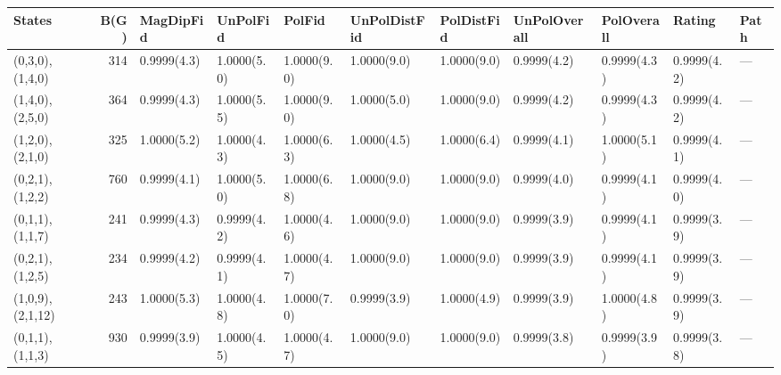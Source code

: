 \begin{tabular}{lrlllllllll}
\hline
 States           &   B(G) & MagDipFid   & UnPolFid    & PolFid      & UnPolDistFid   & PolDistFid   & UnPolOverall   & PolOverall   & Rating      & Path   \\
\hline
 (0,3,0),(1,4,0)  &    314 & 0.9999(4.3) & 1.0000(5.0) & 1.0000(9.0) & 1.0000(9.0)    & 1.0000(9.0)  & 0.9999(4.2)    & 0.9999(4.3)  & 0.9999(4.2) & ---    \\
 (1,4,0),(2,5,0)  &    364 & 0.9999(4.3) & 1.0000(5.5) & 1.0000(9.0) & 1.0000(5.0)    & 1.0000(9.0)  & 0.9999(4.2)    & 0.9999(4.3)  & 0.9999(4.2) & ---    \\
 (1,2,0),(2,1,0)  &    325 & 1.0000(5.2) & 1.0000(4.3) & 1.0000(6.3) & 1.0000(4.5)    & 1.0000(6.4)  & 0.9999(4.1)    & 1.0000(5.1)  & 0.9999(4.1) & ---    \\
 (0,2,1),(1,2,2)  &    760 & 0.9999(4.1) & 1.0000(5.0) & 1.0000(6.8) & 1.0000(9.0)    & 1.0000(9.0)  & 0.9999(4.0)    & 0.9999(4.1)  & 0.9999(4.0) & ---    \\
 (0,1,1),(1,1,7)  &    241 & 0.9999(4.3) & 0.9999(4.2) & 1.0000(4.6) & 1.0000(9.0)    & 1.0000(9.0)  & 0.9999(3.9)    & 0.9999(4.1)  & 0.9999(3.9) & ---    \\
 (0,2,1),(1,2,5)  &    234 & 0.9999(4.2) & 0.9999(4.1) & 1.0000(4.7) & 1.0000(9.0)    & 1.0000(9.0)  & 0.9999(3.9)    & 0.9999(4.1)  & 0.9999(3.9) & ---    \\
 (1,0,9),(2,1,12) &    243 & 1.0000(5.3) & 1.0000(4.8) & 1.0000(7.0) & 0.9999(3.9)    & 1.0000(4.9)  & 0.9999(3.9)    & 1.0000(4.8)  & 0.9999(3.9) & ---    \\
 (0,1,1),(1,1,3)  &    930 & 0.9999(3.9) & 1.0000(4.5) & 1.0000(4.7) & 1.0000(9.0)    & 1.0000(9.0)  & 0.9999(3.8)    & 0.9999(3.9)  & 0.9999(3.8) & ---    \\
\hline
\end{tabular}